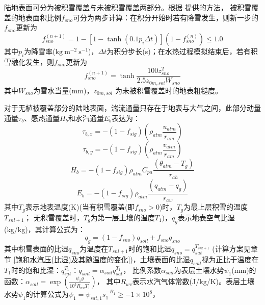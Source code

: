 陆地表面可分为被积雪覆盖与未被积雪覆盖两部分。根据 \citet{swenson2012new}提供的方法，
被积雪覆盖的地表面积比例$f_{sno}$可分为两步计算：在积分开始时若有降雪发生，则新一步的$f_{sno}$更新为
\begin{equation}
f_{{sno }}^{(n+1)}=1-\left[1-\tanh\left(0.1 p_{i} \Delta t\right)\right]\left(1-f_{{sno }}^{(n)}\right) \leq 1.0
\end{equation}
其中$p_i$为降雪率($\mathrm{kg\ m^{-2}\ s^{-1}}$)，$\Delta t$为积分步长(s)；在水热过程模拟结束后，若有积雪融化发生，则$f_{sno}$更新为
\begin{equation}
f_{sno}^{(n+1)}=\tanh \frac{100 z_{s n o}^{2}}{2.5 z_{0 m, s o i} W_{sno}}
\end{equation}
其中$W_{sno}$为雪水当量(mm)，$z_{0m,soi}$ 为未被积雪覆盖时的地表粗糙度。

对于无植被覆盖部分的陆地表面，湍流通量只存在于地表与大气之间，此部分动量通量$\tau_b$、感热通量$H_b$和水汽通量$E_b$表达为：
\begin{equation}\label{taub_x}
\tau_{b, x}=-\left(1-f_{sig}\right)\left(\rho_{atm} \frac{u_{atm}}{r_{a m}}\right)
\end{equation}
\begin{equation}\label{taub_y}
\tau_{b, y}=-\left(1-f_{sig}\right)\left(\rho_{atm} \frac{v_{atm}}{r_{a m}}\right)
\end{equation}
\begin{equation}\label{Hb}
H_{b}=-\left(1-f_{sig}\right) \rho_{atm} C_{p a} \frac{\left(\theta_{atm}-T_{g}\right)}{r_{a h}}
\end{equation}
\begin{equation}\label{Eb}
E_{b}=-\left(1-f_{sig}\right) \rho_{atm} \frac{\left(q_{atm}-q_{g}\right)}{r_{a w}}
\end{equation}
其中$T_g$表示地表温度(K)(当有积雪覆盖(即$f_{sno}>0$)时，$T_g$为最上层积雪的温度$T_{snl+1}$；
无积雪覆盖时，$T_g$为第一层土壤的温度$T_1$)，$q_g$表示地表空气比湿(kg/kg)，其计算公式为：
\begin{equation}
q_{g}=\left(1-f_{{sno }}\right) q_{{soil }}+f_{{sno }} q_{{sno }}
\end{equation}
其中积雪表面的比湿$q_{sno}$为温度在$T_{snl+1}$时的饱和比湿$q_{sno}=q_{sat}^{T_{snl+1}}$
(计算方案见章节 \ref{饱和水汽压(比湿)及其随温度的变化})，土壤表面的比湿$q_{soil}$视为正比于温度在$T_1$时的饱和比湿：$q_{sat}^{T_1}：q_{soil}=\alpha_{soil}q_{sat}^{T_1}$，
比例系数$\alpha_{soil}$为表层土壤水势$\psi_1$(mm)的函数\citep{philip1957theory}：$\alpha_{soil}=\exp \left(\frac{\psi_1g}{{10}^3R_{wv}T_1}\right)$，
其中$R_{wv}$表示水汽气体常数(J/kg/K)。表层土壤水势$\psi_1$的计算公式为$\psi_1=\psi_{sat,1}s_1^{-B_1}\geq-1\times{10}^8$，
